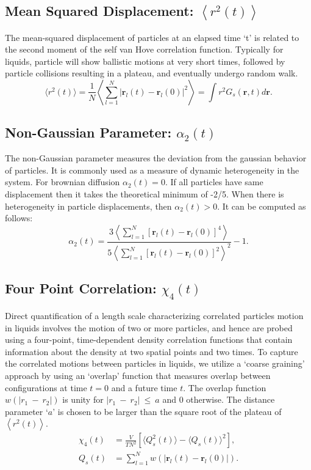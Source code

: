 \documentclass{article}
\begin{document}
\subsection{Mean Squared Displacement: $\left<r^2(t)\right>$} \label{sec::MSD}
The mean-squared displacement of particles at an elapsed time `t' is related to the second moment of the self van Hove correlation function. Typically for liquids, particle will show ballistic motions at very short times, followed by particle collisions resulting in a plateau, and eventually undergo random walk.
\begin{equation}
\langle r^2(t)\rangle = \frac{1}{N}\left\langle\sum\limits_{l=1}^N |\mathbf{r}_l(t) - \mathbf{r}_l(0)|^2\right\rangle = \int r^2G_s(\mathbf{r},t)d\mathbf{r}.
\end{equation}

\subsection{Non-Gaussian Parameter: $\alpha_2(t)$} \label{sec::alpha2}
The non-Gaussian parameter measures the deviation from the gaussian behavior of particles. It is commonly used as a measure of dynamic heterogeneity in the system. For brownian diffusion $\alpha_2(t) = 0$. If all particles have same displacement then it takes the theoretical minimum of -2/5. When there is heterogeneity in particle displacements, then $\alpha_2(t) > 0$. It can be computed as follows:
\begin{equation}
\alpha_2(t) = \frac{3\left\langle\sum\limits_{l=1}^N[\mathbf{r}_l(t) - \mathbf{r}_l(0)]^4\right\rangle}{5\left\langle\sum\limits_{l=1}^N[\mathbf{r}_l(t) - \mathbf{r}_l(0)]^2\right\rangle^2} - 1.
\end{equation}
 
 \subsection{Four Point Correlation: $\chi_4(t)$} \label{sec::chi4}
Direct quantification of a length scale characterizing correlated particles motion in liquids involves the motion of two or more particles, and hence are probed using a four-point, time-dependent density correlation functions that contain information about the density at two spatial points and two times. To capture the correlated motions between particles in liquids, we utilize a `coarse graining' approach by using an `overlap' function that measures overlap between configurations at time $t=0$ and a future time $t$.  The overlap function $w(|r_1~-~r_2|)$ is unity for $|r_1~-~r_2|~\leq~a$ and 0 otherwise. The distance parameter `$a$' is chosen to be larger than the square root of the plateau of $\left<r^2(t)\right>$.
\begin{equation}
\begin{split}
\chi_4(t) &= \frac{V}{TN^2}[\langle Q_s^2(t)\rangle - \langle Q_s(t)\rangle^2],\\
Q_s(t) &= \sum_{l=1}^N \textit{w}(|\mathbf{r}_l(t) - \mathbf{r}_l(0)|).
\end{split}
\end{equation}
\end{document}
